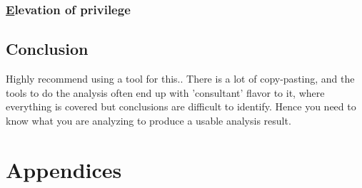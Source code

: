 \documentclass[
	letterpaper, %
	10pt, %
	unnumberedsections, %
	twoside, %
]{APAAssignment}
\begin{document}
\subsection{\underline{E}levation of privilege} 







\section{Conclusion}
Highly recommend using a tool for this..
There is a lot of copy-pasting, and the tools to do the analysis often end up with 'consultant' flavor to it, where everything is covered but conclusions are difficult to identify. Hence you need to know what you are analyzing to produce a usable analysis result.


\clearpage
\printbibliography %





\appendix


\clearpage
\chapter{Appendices}
\begin{appendices}

\end{appendices}
\end{document}
